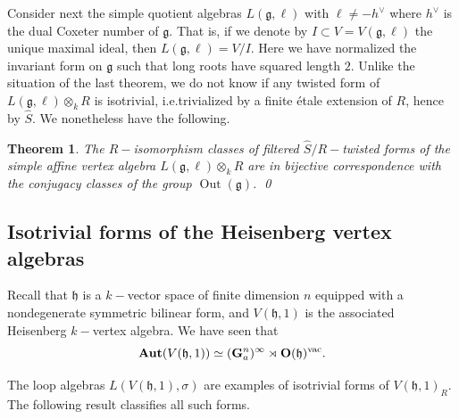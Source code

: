 \documentclass{article}
\newtheorem{thm}{Theorem}[section]
\theoremstyle{definition}
\def\Out{\ensuremath{\operatorname{Out}}}
\def\Aut{\ensuremath{\operatorname{Aut}}}
\def\BAut{\ensuremath{\operatorname{\mathbf{Aut}}}}
\def\fg{\ensuremath{\mathfrak{g}}}
\def\hS{\ensuremath{\widehat S}}
\begin{document}

Consider next the simple quotient algebras $L(\mathfrak g, \ell)$ with $\ell \neq -h^\vee$ where  $h^\vee$ is the dual Coxeter number of $\mathfrak g$.  That is, if we denote by $I \subset V = V(\mathfrak g,\ell)$ the unique maximal ideal, then $L(\mathfrak g, \ell) = V/I$. Here we have normalized the invariant form on $\fg$ such that long roots have squared length $2$.
Unlike the situation of the last theorem, we do not know if any twisted form of $L(\mathfrak g, \ell) \otimes_k R$ is isotrivial, i.e.\@ trivialized by a finite \'etale extension of $R$, hence by $\hS.$  We nonetheless have the following.

\begin{thm} \label{Lforms}
    The $R-$isomorphism classes of filtered $\widehat S/R-$twisted forms of the simple affine vertex algebra $L(\mathfrak g, \ell) \otimes_k R$ are in bijective correspondence with the conjugacy classes of the group $\Out(\fg)$. \qed
\end{thm}

\subsection{Isotrivial forms of the Heisenberg vertex algebras}
Recall that $\mathfrak h$ is a $k-$vector space of finite dimension $n$ equipped with a nondegenerate symmetric bilinear form, and  $V(\mathfrak h,1)$ is the associated Heisenberg $k-$vertex algebra. We have seen that
    $$ \BAut(V(\mathfrak h, 1)) \simeq (\mathbf G_a^n)^\infty \rtimes \mathbf O(\mathfrak h)^{\rm vac}. $$
    
 The loop algebras $L(V(\mathfrak h,1), \sigma)$ are examples of isotrivial forms of $V(\mathfrak h,1)_R.$ The following result  classifies all such forms.
 
\end{document}
